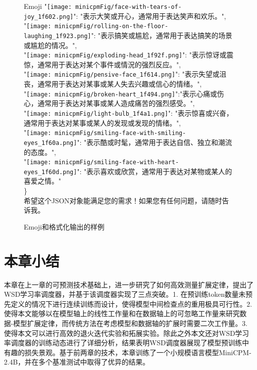\begin{figure}[]
{\begin{AIbox}{Emoji}
{{    "\texttt{[image: minicpmFig/face-with-tears-of-joy\_1f602.png]}": "表示大笑或开心，通常用于表达笑声和欢乐。", \\
    "\texttt{[image: minicpmFig/rolling-on-the-floor-laughing\_1f923.png]}": "表示搞笑或尴尬，通常用于表达搞笑的场景或尴尬的情况。", \\
    "\texttt{[image: minicpmFig/exploding-head\_1f92f.png]}": "表示惊讶或震惊，通常用于表达对某个事件或情況的强烈反应。",\\
    "\texttt{[image: minicpmFig/pensive-face\_1f614.png]}": "表示失望或沮丧，通常用于表达对某事或某人失去兴趣或信心的情绪。", \\
    "\texttt{[image: minicpmFig/broken-heart\_1f494.png]}":"表示心痛或伤心，通常用于表达对某事或某人造成痛苦的强烈感受。", \\
    "\texttt{[image: minicpmFig/light-bulb\_1f4a1.png]}": "表示惊喜或兴奋，通常用于表达对某事或某人的发现或发现的情绪。",\\
    "\texttt{[image: minicpmFig/smiling-face-with-smiling-eyes\_1f60a.png]}": "表示酷或时髦，通常用于表达自信、独立和潮流的态度。",\\
    "\texttt{[image: minicpmFig/smiling-face-with-heart-eyes\_1f60d.png]}": "表示喜欢或欣赏，通常用于表达对某物或某人的喜爱之情。"\\
    \} \\
    希望这个JSON对象能满足您的需求！如果您有任何问题，请随时告诉我。}
    }
    \hspace{0.01\linewidth}
    \end{AIbox}
    }
    \caption{Emoji和格式化输出的样例}
    \label{fig:emoji}
    \end{figure}


\section{本章小结}
本章在上一章的可预测技术基础上，进一步研究了如何高效测量扩展定律，提出了WSD学习率调度器，并基于该调度器实现了三点突破。1. 在预训练token数量未预先定义的情况下进行连续训练而设计，使得模型中间检查点的重用极具可行性。2. 使得本文能够以在模型轴上的线性工作量和在数据轴上的可忽略工作量来研究数据-模型扩展定律，而传统方法在考虑模型和数据轴的扩展时需要二次工作量。3. 使得本文可以进行高效的退火迭代实验和拓展实验。除此之外本文还对WSD学习率调度器的训练动态进行了详细分析，结果表明WSD调度器展现了模型预训练中有趣的损失景观。基于前两章的技术，本章训练了一个小规模语言模型MiniCPM-2.4B，并在多个基准测试中取得了优异的结果。